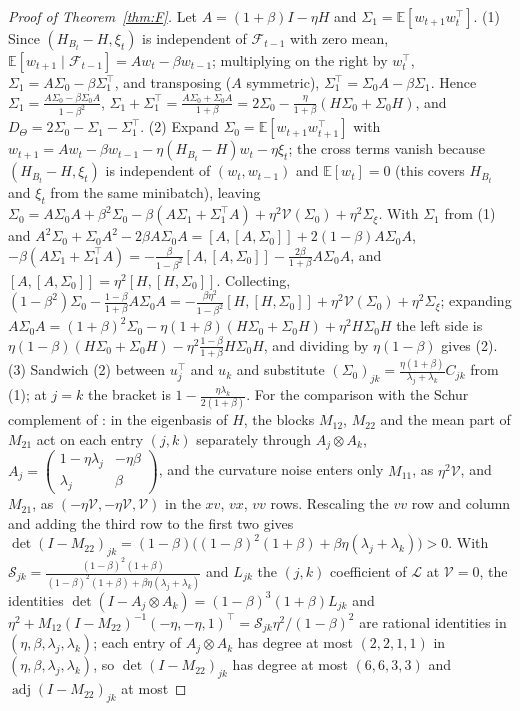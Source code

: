 \documentclass[11pt]{article}
\theoremstyle{remark}
\newcommand{\E}{\mathbb{E}}
\begin{document}
\begin{proof}[Proof of Theorem~\ref{thm:F}]
Let $A=(1+\beta)I-\eta H$ and $\Sigma_1=\E[w_{t+1}w_t^\top]$. (1) Since $(H_{B_t}-H,\xi_t)$ is independent of $\mathcal F_{t-1}$ with zero mean, $\E[w_{t+1}\mid\mathcal F_{t-1}]=Aw_t-\beta w_{t-1}$; multiplying on the right by $w_t^\top$, $\Sigma_1=A\Sigma_0-\beta\Sigma_1^\top$, and transposing ($A$ symmetric), $\Sigma_1^\top=\Sigma_0A-\beta\Sigma_1$. Hence $\Sigma_1=\frac{A\Sigma_0-\beta\Sigma_0A}{1-\beta^2}$, $\Sigma_1+\Sigma_1^\top=\frac{A\Sigma_0+\Sigma_0A}{1+\beta}=2\Sigma_0-\frac{\eta}{1+\beta}(H\Sigma_0+\Sigma_0H)$, and $D_\Theta=2\Sigma_0-\Sigma_1-\Sigma_1^\top$. (2) Expand $\Sigma_0=\E[w_{t+1}w_{t+1}^\top]$ with $w_{t+1}=Aw_t-\beta w_{t-1}-\eta(H_{B_t}-H)w_t-\eta\xi_t$; the cross terms vanish because $(H_{B_t}-H,\xi_t)$ is independent of $(w_t,w_{t-1})$ and $\E[w_t]=0$ (this covers $H_{B_t}$ and $\xi_t$ from the same minibatch), leaving $\Sigma_0=A\Sigma_0A+\beta^2\Sigma_0-\beta(A\Sigma_1+\Sigma_1^\top A)+\eta^2\mathcal V(\Sigma_0)+\eta^2\Sigma_\xi$. With $\Sigma_1$ from (1) and $A^2\Sigma_0+\Sigma_0A^2-2\beta A\Sigma_0A=[A,[A,\Sigma_0]]+2(1-\beta)A\Sigma_0A$, $-\beta(A\Sigma_1+\Sigma_1^\top A)=-\frac{\beta}{1-\beta^2}[A,[A,\Sigma_0]]-\frac{2\beta}{1+\beta}A\Sigma_0A$, and $[A,[A,\Sigma_0]]=\eta^2[H,[H,\Sigma_0]]$. Collecting, $(1-\beta^2)\Sigma_0-\frac{1-\beta}{1+\beta}A\Sigma_0A=-\frac{\beta\eta^2}{1-\beta^2}[H,[H,\Sigma_0]]+\eta^2\mathcal V(\Sigma_0)+\eta^2\Sigma_\xi$; expanding $A\Sigma_0A=(1+\beta)^2\Sigma_0-\eta(1+\beta)(H\Sigma_0+\Sigma_0H)+\eta^2H\Sigma_0H$ the left side is $\eta(1-\beta)(H\Sigma_0+\Sigma_0H)-\eta^2\frac{1-\beta}{1+\beta}H\Sigma_0H$, and dividing by $\eta(1-\beta)$ gives (2). (3) Sandwich (2) between $u_j^\top$ and $u_k$ and substitute $(\Sigma_0)_{jk}=\frac{\eta(1+\beta)}{\lambda_j+\lambda_k}C_{jk}$ from (1); at $j=k$ the bracket is $1-\frac{\eta\lambda_k}{2(1+\beta)}$. For the comparison with the Schur complement of \citet{andreyev2026momentum}: in the eigenbasis of $H$, the blocks $M_{12}$, $M_{22}$ and the mean part of $M_{21}$ act on each entry $(j,k)$ separately through $A_j\otimes A_k$, $A_j=\begin{pmatrix}1-\eta\lambda_j&-\eta\beta\\\lambda_j&\beta\end{pmatrix}$, and the curvature noise enters only $M_{11}$, as $\eta^2\mathcal V$, and $M_{21}$, as $(-\eta\mathcal V,-\eta\mathcal V,\mathcal V)$ in the $xv$, $vx$, $vv$ rows. Rescaling the $vv$ row and column and adding the third row to the first two gives $\det(I-M_{22})_{jk}=(1-\beta)\big((1-\beta)^2(1+\beta)+\beta\eta(\lambda_j+\lambda_k)\big)>0$. With $\mathcal S_{jk}=\frac{(1-\beta)^2(1+\beta)}{(1-\beta)^2(1+\beta)+\beta\eta(\lambda_j+\lambda_k)}$ and $L_{jk}$ the $(j,k)$ coefficient of $\mathcal L$ at $\mathcal V=0$, the identities $\det(I-A_j\otimes A_k)=(1-\beta)^3(1+\beta)L_{jk}$ and $\eta^2+M_{12}(I-M_{22})^{-1}(-\eta,-\eta,1)^\top=\mathcal S_{jk}\eta^2/(1-\beta)^2$ are rational identities in $(\eta,\beta,\lambda_j,\lambda_k)$; each entry of $A_j\otimes A_k$ has degree at most $(2,2,1,1)$ in $(\eta,\beta,\lambda_j,\lambda_k)$, so $\det(I-M_{22})_{jk}$ has degree at most $(6,6,3,3)$ and $\operatorname{adj}(I-M_{22})_{jk}$ at most 
\end{proof}
\end{document}
